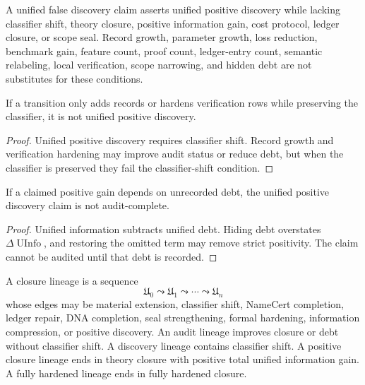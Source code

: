 \begin{definition}
\label{def:philosophy-unified-false-discovery-claim}
A unified false discovery claim asserts unified positive discovery while
lacking classifier shift, theory closure, positive information gain,
cost protocol, ledger closure, or scope seal. Record growth, parameter
growth, loss reduction, benchmark gain, feature count, proof count,
ledger-entry count, semantic relabeling, local verification, scope
narrowing, and hidden debt are not substitutes for these conditions.
\end{definition}

\begin{theorem}
\label{thm:philosophy-record-growth-hardening-not-unified-positive-discovery}
If a transition only adds records or hardens verification rows while
preserving the classifier, it is not unified positive discovery.
\end{theorem}
\begin{proof}
Unified positive discovery requires classifier shift. Record growth and
verification hardening may improve audit status or reduce debt, but when
the classifier is preserved they fail the classifier-shift condition.
\end{proof}

\begin{theorem}
\label{thm:philosophy-hidden-debt-invalidates-unified-positivity}
If a claimed positive gain depends on unrecorded debt, the unified
positive discovery claim is not audit-complete.
\end{theorem}
\begin{proof}
Unified information subtracts unified debt. Hiding debt overstates
$\Delta\operatorname{UInfo}$, and restoring the omitted term may remove
strict positivity. The claim cannot be audited until that debt is
recorded.
\end{proof}

\begin{definition}
\label{def:philosophy-closure-lineage}
A closure lineage is a sequence
$$
\mathfrak U_0\leadsto\mathfrak U_1\leadsto\cdots\leadsto\mathfrak U_n
$$
whose edges may be material extension, classifier shift, NameCert
completion, ledger repair, DNA completion, seal strengthening, formal
hardening, information compression, or positive discovery. An audit
lineage improves closure or debt without classifier shift. A discovery
lineage contains classifier shift. A positive closure lineage ends in
theory closure with positive total unified information gain. A fully
hardened lineage ends in fully hardened closure.
\end{definition}

